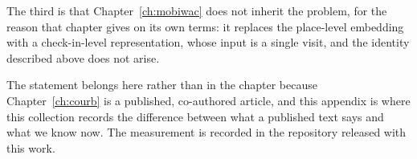 The third is that Chapter~\ref{ch:mobiwac} does not inherit the problem, for the reason
that chapter gives on its own terms: it replaces the place-level embedding with a
check-in-level representation, whose input is a single visit, and the identity described
above does not arise.

The statement belongs here rather than in the chapter because Chapter~\ref{ch:courb} is a published,
co-authored article, and this appendix is where this collection records the difference between what
a published text says and what we know now. The
measurement is recorded in the repository released with this work.
